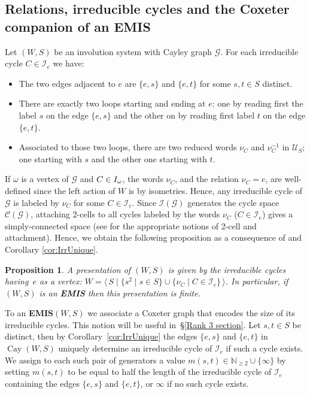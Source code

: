 \documentclass[A4paper, oneside]{amsart}
\newcommand{\N}{\mathbb{N}}
\newcommand{\id}{\textit{e}}
\newcommand{\mpair}[1]{\langle\, #1\,\rangle}  %
\newcommand{\Cay}{\operatorname{Cay}}
\newcommand{\Irr}{\mathcal{I}}
\newcommand{\U}{\mathcal{U}}
\newcommand{\G}{\mathcal{G}}
\newcommand{\EMIS}{\textnormal{\bf EMIS}\xspace}
\newtheorem{prop}[thm]{Proposition}
\theoremstyle{definition}
\begin{document}
\subsection{Relations, irreducible cycles and the Coxeter companion of an \EMIS}
\label{ss:RelationsIrred} 
Let $(W,S)$ be an involution system with Cayley graph $\G$. For each irreducible cycle $C \in \Irr_{\id}$ we have:
\begin{itemize}
	\item The two edges adjacent to $\id$ are $\{e,s\}$ and $\{e,t\}$ for some $s,t\in S$ distinct. 
	\item There are exactly two loops starting and ending at $\id$: one by reading first the label $s$ on the edge $\{e,s\}$ and the other on by reading first label $t$ on the edge $\{e,t\}$. 
	\item Associated to those two loops, there are two reduced words $\nu_C$ and $\nu_C^{-1}$ in $\U_S$; one starting with $s$ and the other one starting with $t$. 
\end{itemize}
If $\omega$ is a vertex of $\G$ and $C \in\mathcal \Irr_\omega$, the words $\nu_C$, and the relation $\nu_C=\id$, are well-defined since the left action of $W$ is by isometries. Hence, any irreducible cycle of $\G$ is labeled by $\nu_C$ for some $C \in \Irr_{\id}$. Since $\Irr(\G)$ generates the cycle space $\mathcal{C}(\G)$, attaching 2-cells to all cycles labeled by the words $\nu_C$ ($C \in \Irr_e$) gives a simply-connected space (see \cite[Appendix \MakeUppercase{}.8A]{BridsonHaefliger} for the appropriate notions of 2-cell and attachment). Hence, we obtain the following proposition as a consequence of \cite[Lemma \MakeUppercase{}.8.9]{BridsonHaefliger} and Corollary \ref{cor:IrrUnique}.

\begin{prop}
\label{prop:RelationsIrred} 
A presentation of $(W,S)$ is given by the irreducible cycles having~$\id$ as a vertex: $W=\mpair{S \mid \{s^2 \mid s \in S\} \cup \{\nu_C \mid C \in \Irr_\id\}}$. In particular, if $(W,S)$ is an \EMIS then this presentation is finite.
\end{prop}

To an \EMIS $(W,S)$ we associate a Coxeter graph that encodes the size of its irreducible cycles. This notion will be useful in~\S\ref{Rank 3 section}.  Let $s,t \in S$ be distinct, then by Corollary~\ref{cor:IrrUnique} the edges $\{\id,s\}$ and $\{\id,t\}$ in $\Cay(W,S)$ uniquely determine an irreducible cycle of $\Irr_e$ if such a cycle exists. We assign to each such pair of generators a value $m(s,t) \in \N_{\geq 2}\cup \{\infty\}$ by setting $m(s,t)$ to be equal to half the length of the irreducible cycle of $\Irr_e$ containing the edges $\{\id,s\}$ and $\{\id,t\}$, or $\infty$ if no such cycle exists. 
\end{document}

